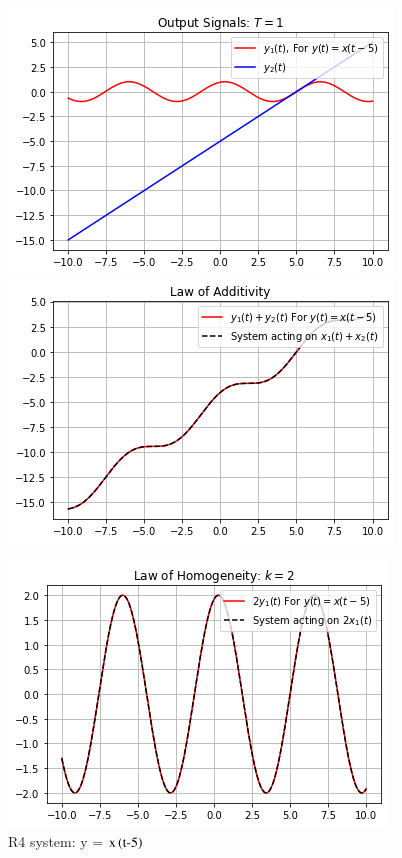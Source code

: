 \documentclass[journal,12pt,twocolumn]{IEEEtran}
\begin{document}
\begin{figure}[h]
\caption{R4 system: y = $\text{x}\left(\text{t-5}\right)$}
\includegraphics[width = \columnwidth]{y4}
\includegraphics[width = \columnwidth]{y4_p}

\includegraphics[width = \columnwidth]{y4_h}


\end{figure}
\end{document}

